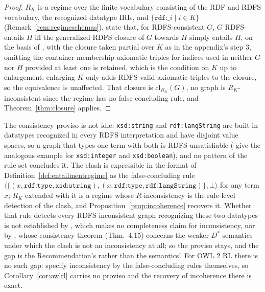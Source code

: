 \documentclass[12pt]{article}
\theoremstyle{definition}
\newcommand{\cl}{\mathrm{cl}}   %
\begin{document}
\begin{proof}
$R_K$ is a regime over the finite vocabulary consisting of the RDF and RDFS vocabulary, the recognized datatype IRIs, and $\{\texttt{rdf:\_}i \mid i \in K\}$ (Remark~\ref{rem:regimeschemas}). \citet[App.~A]{hayes2014rdf} state that, for RDFS-consistent $G$, $G$ RDFS-entails $H$ iff the generalized RDFS closure of $G$ towards $H$ simply entails $H$, on the basis of \citet[Thm.~4.12]{terhorst2005completeness}, with the closure taken partial over $K$ as in the appendix's step 3, omitting the container-membership axiomatic triples for indices used in neither $G$ nor $H$ provided at least one is retained, which is the condition on $K$ up to enlargement; enlarging $K$ only adds RDFS-valid axiomatic triples to the closure, so the equivalence is unaffected. That closure is $\cl_{R_K}(G)$, no graph is $R_K$-inconsistent since the regime has no false-concluding rule, and Theorem~\ref{thm:closure} applies.
\end{proof}

The consistency proviso is not idle: \texttt{xsd:string} and \texttt{rdf:langString} are built-in datatypes recognized in every RDFS interpretation and have disjoint value spaces, so a graph that types one term with both is RDFS-unsatisfiable (\citealp[\S 9.2.1]{hayes2014rdf} give the analogous example for \texttt{xsd:integer} and \texttt{xsd:boolean}), and no pattern of the rule set concludes it. The clash is expressible in the format of Definition~\ref{def:entailmentregime} as the false-concluding rule $\langle\{(x,\allowbreak \texttt{rdf:type},\allowbreak \texttt{xsd:string}),\allowbreak (x, \texttt{rdf:type},\allowbreak \texttt{rdf:langString})\},\allowbreak \bot\rangle$ for any term $x$; $R_K$ extended with it is a regime whose $R$-inconsistency is the rule-level detection of the clash, and Proposition~\ref{prop:incoherence} recovers it. Whether that rule detects every RDFS-inconsistent graph recognizing these two datatypes is not established by \citet[App.~A]{hayes2014rdf}, which makes no completeness claim for inconsistency, nor by \citet{terhorst2005completeness}, whose consistency theorem (Thm.~4.15) concerns the weaker $D^{*}$ semantics under which the clash is not an inconsistency at all; so the proviso stays, and the gap is the Recommendation's rather than the semantics'. For OWL 2 RL there is no such gap: \citet{motik2012owl} specify inconsistency by the false-concluding rules themselves, so Corollary~\ref{cor:owlrl} carries no proviso and the recovery of incoherence there is exact.
\end{document}
